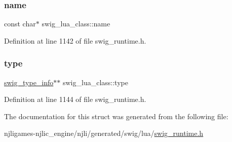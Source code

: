 \subsubsection{\texorpdfstring{name}{name}}
{\footnotesize\ttfamily const char$\ast$ swig\+\_\+lua\+\_\+class\+::name}



Definition at line 1142 of file swig\+\_\+runtime.\+h.

\mbox{\label{structswig__lua__class_a139831b0d9b661d6e64c1f902d63142d}} 
\subsubsection{\texorpdfstring{type}{type}}
{\footnotesize\ttfamily \mbox{\hyperlink{structswig__type__info}{swig\+\_\+type\+\_\+info}}$\ast$$\ast$ swig\+\_\+lua\+\_\+class\+::type}



Definition at line 1144 of file swig\+\_\+runtime.\+h.



The documentation for this struct was generated from the following file\+:\begin{DoxyCompactItemize}
\item 
njligames-\/njlic\+\_\+engine/njli/generated/swig/lua/\mbox{\hyperlink{swig__runtime_8h}{swig\+\_\+runtime.\+h}}\end{DoxyCompactItemize}
